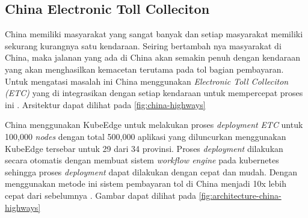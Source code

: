 
\subsection{China Electronic Toll Colleciton}
China memiliki masyarakat yang sangat banyak dan setiap masyarakat memiliki sekurang kurangnya satu kendaraan. Seiring bertambah nya masyarakat di China, maka jalanan yang ada di China akan semakin penuh dengan kendaraan yang akan menghasilkan kemacetan terutama pada tol bagian pembayaran. Untuk mengatasi masalah ini China menggunakan \textit{Electronic Toll Colleciton (ETC)} yang di integrasikan dengan setiap kendaraan untuk mempercepat proses ini \parencite{penelitianterkait1}. Arsitektur dapat dilihat pada \ref{fig:china-highways}

China menggunakan KubeEdge untuk melakukan proses \textit{deployment} \textit{ETC} untuk 100,000 \textit{nodes} dengan total 500,000 aplikasi yang diluncurkan menggunakan KubeEdge tersebar untuk 29 dari 34 provinsi. Proses \textit{deployment} dilakukan secara otomatis dengan membuat sistem \textit{workflow engine} pada kubernetes sehingga proses \textit{deployment} dapat dilakukan dengan cepat dan mudah. Dengan menggunakan metode ini sistem pembayaran tol di China menjadi 10x lebih cepat dari sebelumnya \parencite{penelitianterkait1}. Gambar dapat dilihat pada \ref{fig:architecture-china-highways}



\pagebreak
